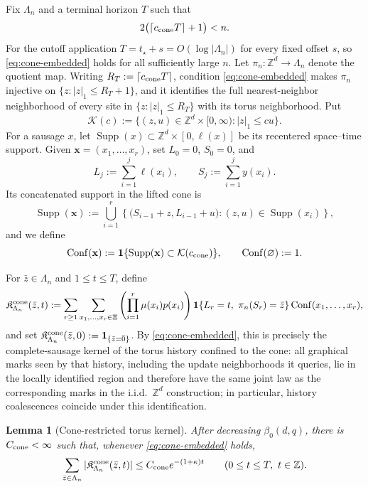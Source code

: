 \documentclass[letterpaper,11pt,reqno]{amsart}
\newtheorem{lemma}[thm]{Lemma}
\theoremstyle{definition}
\newcommand{\IK}{\mathfrak{K}}
\begin{document}
Fix \(\Lambda_n\) and a terminal horizon \(T\) such that
\begin{equation}\label{eq:cone-embedded}
2\bigl(\lceil c_{\rm cone}T\rceil+1\bigr)<n.
\end{equation}
For the cutoff application \(T=t_\star+s=O(\log|\Lambda_n|)\) for every fixed
offset \(s\), so \eqref{eq:cone-embedded} holds for all sufficiently large
\(n\).
Let \(\pi_n:\mathbb Z^d\to\Lambda_n\) denote the quotient map. Writing
\(R_T:=\lceil c_{\rm cone}T\rceil\), condition
\eqref{eq:cone-embedded} makes \(\pi_n\) injective on
\(\{z:|z|_1\le R_T+1\}\), and it identifies the full nearest-neighbor
neighborhood of every site in \(\{z:|z|_1\le R_T\}\) with its torus
neighborhood. Put
\[
\mathcal K(c):=
\{(z,u)\in\mathbb Z^d\times[0,\infty):|z|_1\le cu\}.
\]
For a sausage \(x\), let \(\operatorname{Supp}(x)\subset
\mathbb Z^d\times[0,\ell(x)]\) be its recentered space--time support. Given
\(\mathbf x=(x_1,\ldots,x_r)\), set \(L_0=0\), \(S_0=0\), and
\[
L_j:=\sum_{i=1}^j\ell(x_i),
\qquad
S_j:=\sum_{i=1}^j y(x_i).
\]
Its concatenated support in the lifted cone is
\[
\operatorname{Supp}(\mathbf x)
:=
\bigcup_{i=1}^r
\left\{
\bigl(S_{i-1}+z,L_{i-1}+u\bigr):
(z,u)\in\operatorname{Supp}(x_i)
\right\},
\]
and we define
\[
\operatorname{Conf}(\mathbf x)
:=
\mathbf 1\{\operatorname{Supp}(\mathbf x)\subset\mathcal K(c_{\rm cone})\},
\qquad
\operatorname{Conf}(\varnothing):=1.
\]

For \(\bar z\in\Lambda_n\) and \(1\le t\le T\), define
\[
\IK_{\Lambda_n}^{\rm cone}(\bar z,t)
:=
\sum_{r\ge1}
\sum_{x_1,\ldots,x_r\in\Xi}
\left(\prod_{i=1}^r\mu(x_i)p(x_i)\right)
\mathbf 1\{L_r=t,\ \pi_n(S_r)=\bar z\}
\operatorname{Conf}(x_1,\ldots,x_r),
\]
and set
\(\IK_{\Lambda_n}^{\rm cone}(\bar z,0):=\mathbf 1_{\{\bar z=\bar0\}}\).
By \eqref{eq:cone-embedded}, this is precisely the complete-sausage kernel of
the torus history confined to the cone: all graphical marks seen by that
history, including the update neighborhoods it queries, lie in the locally
identified region and therefore have the same joint law as the corresponding
marks in the i.i.d.\ \(\mathbb Z^d\) construction; in particular, history
coalescences coincide under this identification.

\begin{lemma}[Cone-restricted torus kernel]
\label{lem:IK-cone-l1}
After decreasing \(\beta_0(d,q)\), there is \(C_{\rm cone}<\infty\) such that, whenever
\eqref{eq:cone-embedded} holds,
\[
        \sum_{\bar z\in\Lambda_n}|\IK_{\Lambda_n}^{\rm cone}(\bar z,t)|
        \le
        C_{\rm cone}e^{-(1+\kappa)t}
        \qquad(0\le t\le T,\ t\in\mathbb Z).
\]
\end{lemma}
\end{document}
